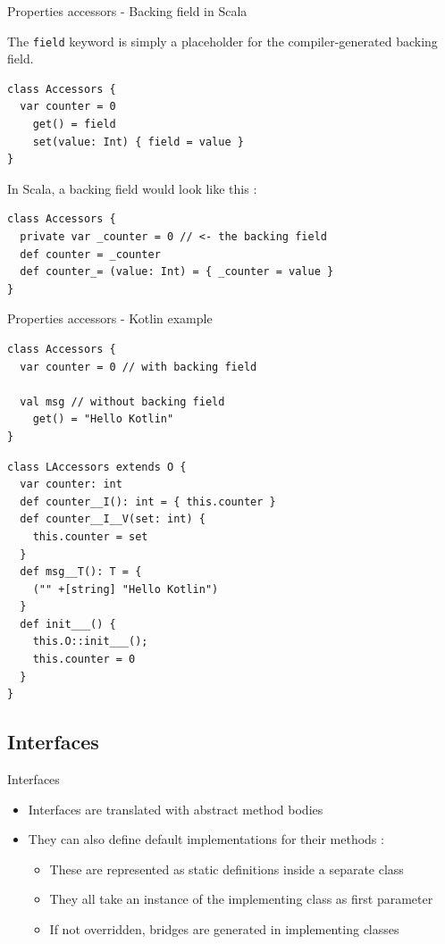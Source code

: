 \documentclass[10pt]{beamer}
\newcommand{\inlinecode}[2]{\colorbox{minted-bg}{\lstinline[language=#1]$#2$}}
\newcommand{\ktinline}[1]{\inlinecode{kotlin}{#1}}
\begin{document}
\begin{frame}[fragile]{Properties accessors - Backing field in Scala}

  The \ktinline{field} keyword is simply a placeholder for the compiler-generated backing field.
  
  \begin{verbatim}
class Accessors {
  var counter = 0
    get() = field
    set(value: Int) { field = value }
}
  \end{verbatim}
  
  In Scala, a backing field would look like this : 
  
  \begin{verbatim}
class Accessors {
  private var _counter = 0 // <- the backing field
  def counter = _counter
  def counter_= (value: Int) = { _counter = value }
}
  \end{verbatim}

\end{frame}

\begin{frame}[fragile]{Properties accessors - Kotlin example}

  \begin{verbatim}
class Accessors {
  var counter = 0 // with backing field

  val msg // without backing field
    get() = "Hello Kotlin"
}
  \end{verbatim}
  \begin{verbatim}
class LAccessors extends O {
  var counter: int
  def counter__I(): int = { this.counter }
  def counter__I__V(set: int) {
    this.counter = set
  }
  def msg__T(): T = {
    ("" +[string] "Hello Kotlin")
  }
  def init___() {
    this.O::init___();
    this.counter = 0
  }
}
  \end{verbatim}
\end{frame}


\subsection{Interfaces}


\begin{frame}{Interfaces}
 \begin{itemize}
  \item Interfaces are translated with abstract method bodies
  \item They can also define default implementations for their methods :
    \begin{itemize}
     \item These are represented as static definitions inside a separate class
     \item They all take an instance of the implementing class as first parameter
     \item If not overridden, bridges are generated in implementing classes
    \end{itemize}
 \end{itemize}
\end{frame}
\end{document}
